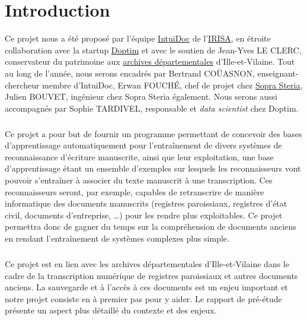 \chapter{Introduction}
\setcounter{page}{1}
\pagestyle{fancy}
\fancyhf{}
\cfoot[\thepage]{\thepage}

Ce projet nous a été proposé par l’équipe \href{https://www-intuidoc.irisa.fr/}{IntuiDoc}
de l’\href{https://www.irisa.fr/}{IRISA}, en étroite collaboration avec la startup
\href{http://www.doptim.eu}{Doptim} et avec le soutien de Jean-Yves LE CLERC, conservateur du
patrimoine aux \href{http://archives.ille-et-vilaine.fr/fr}{archives départementales} d'Ille-et-Vilaine.
Tout au long de l’année, nous serons encadrés par Bertrand COÜASNON, enseignant-chercheur membre d'IntuiDoc,
Erwan FOUCHÉ, chef de projet chez \href{https://www.soprasteria.com/fr}{Sopra Steria}, Julien BOUVET,
ingénieur chez Sopra Steria également. Nous serons aussi accompagnés par Sophie TARDIVEL, responsable
et \textit{data scientist} chez Doptim.

\paragraph{}
Ce projet a pour but de fournir un programme permettant de concevoir des bases d’apprentissage
automatiquement pour l’entraînement de divers systèmes de reconnaissance d’écriture manuscrite,
ainsi que leur exploitation, une base d'apprentissage étant un ensemble
d'exemples sur lesquels les reconnaisseurs vont pouvoir s'entraîner à associer
du texte manuscrit à une transcription. Ces reconnaisseurs seront, par exemple,
capables de retranscrire de manière informatique des documents manuscrits
(registres paroissiaux, registres d’état civil, documents d’entreprise,
\ldots) pour les rendre plus exploitables. Ce projet permettra donc de gagner
du temps sur la compréhension de documents anciens en rendant l’entraînement
de systèmes complexes plus simple.

\paragraph{}
Ce projet est en lien avec les archives départementales d’Ille-et-Vilaine dans le cadre de la transcription numérique de registres paroissiaux et autres documents anciens. La sauvegarde et à l’accès à ces documents est un enjeu important et notre projet consiste en à premier pas pour y aider. Le rapport de pré-étude présente un aspect plus détaillé du contexte et des enjeux.

